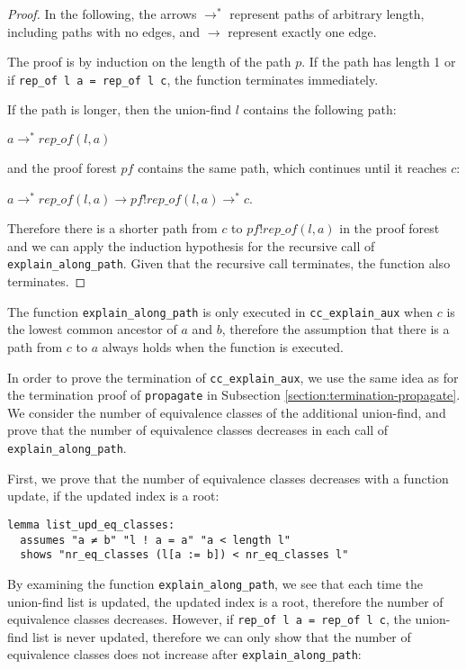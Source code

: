 \begin{proof}
In the following, the arrows $\rightarrow^*$ represent paths of arbitrary length, including paths with no edges, and $\rightarrow$ represent exactly one edge.

The proof is by induction on the length of the path $p$.
If the path has length 1 or if \lstinline{rep_of l a = rep_of l c}, the function terminates immediately.

If the path is longer, then the union-find $l$ contains the following path:

$a \rightarrow^* rep\_of(l,a)$

and the proof forest $pf$ contains the same path, which continues until it reaches $c$:

$a \rightarrow^* rep\_of(l,a) \rightarrow pf ! rep\_of(l,a) \rightarrow^* c$.

Therefore there is a shorter path from $c$ to $pf ! rep\_of(l,a)$ in the proof forest and we can apply the induction hypothesis for the recursive call of \lstinline{explain_along_path}. Given that the recursive call terminates, the function also terminates.
\end{proof}

The function \lstinline{explain_along_path} is only executed in \lstinline{cc_explain_aux} when $c$ is the lowest common ancestor of $a$ and $b$, therefore the assumption that there is a path from $c$ to $a$ always holds when the function is executed.

In order to prove the termination of \lstinline{cc_explain_aux}, we use the same idea as for the termination proof of \lstinline{propagate} in Subsection \ref{section:termination-propagate}. We consider the number of equivalence classes of the additional union-find, and prove that the number of equivalence classes decreases in each call of \lstinline{explain_along_path}.

First, we prove that the number of equivalence classes decreases with a function update, if the updated index is a root:

\begin{lstlisting}
lemma list_upd_eq_classes:
  assumes "a ≠ b" "l ! a = a" "a < length l"
  shows "nr_eq_classes (l[a := b]) < nr_eq_classes l"
\end{lstlisting}

By examining the function \lstinline{explain_along_path}, we see that each time the union-find list is updated, the updated index is a root, therefore the number of equivalence classes decreases.
However, if \lstinline{rep_of l a = rep_of l c}, the union-find list is never updated, therefore we can only show that the number of equivalence classes does not increase after \lstinline{explain_along_path}:

